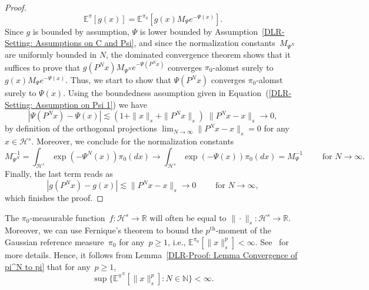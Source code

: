 \begin{proof}
\begin{equation*}
   \mathbb{E}^{\pi} [g(x)] = \mathbb{E}^{\pi_0} [g(x)M_{\Psi} e^{-\Psi(x)} ].
 \end{equation*}
 Since $g$ is bounded by assumption, $\Psi$ is lower bounded by Assumption~\ref{DLR-Setting: Assumptions on C and Psi}, and since the normalization constants~$M_{\Psi^N}$ are uniformly bounded in $N$, the dominated convergence theorem shows that it suffices to prove that $g(P^Nx) M_{\Psi^N} e^{-\Psi(P^Nx)}$ converges $\pi_0$-alomst surely to $g(x)M_{\Psi} e^{-\Psi(x)}$. Thus, we start to show that $\Psi(P^Nx)$ converges $\pi_0$-alomst surely to $\Psi(x)$. Using the boundedness assumption given in Equation~(\ref{DLR-Setting: Assumption on Psi 1}) we have
 \begin{equation*}
  | \Psi(P^Nx) - \Psi(x) | \lesssim  (1 + \|x\|_s + \|P^Nx\|_s) \; \|P^Nx-x\|_s \to 0,
 \end{equation*}
 by definition of the orthogonal projections $\lim_{N \to \infty}   \|P^Nx-x\|_s = 0$ for any $x \in \mathcal{H}^s$. Moreover, we conclude for the normalization constants
 \begin{equation*}
   M_{\Psi^N}^{-1}  = \int_{\mathcal{H}^s} \exp (-\Psi^N(x)) \pi_0(dx) \longrightarrow \int_{\mathcal{H}^s} \exp (-\Psi(x)) \pi_0(dx) = M_{\Psi}^{-1} \qquad \text{ for } N \to \infty.
 \end{equation*}
 Finally, the last term reads as
 \begin{equation*}
  |g(P^Nx) - g(x)| \lesssim \|P^Nx-x\|_s \longrightarrow 0 \qquad \text{ for } N \to \infty,
 \end{equation*}
 which finishes the proof.

\end{proof}

\begin{rem}
  \label{DLR: Remark Fernique's theorem}
  The $\pi_0$-measurable function~$f:\mathcal{H}^s \to \mathbb{R}$ will often be equal to $\| \cdot \|_s :\mathcal{H}^s \to \mathbb{R}$. Moreover, we can use Fernique's theorem to bound the $p^{\text{th}}$-moment of the Gaussian reference measure~$\pi_0$ for any~$p \geq 1$, i.e., $\mathbb{E}^{\pi_0}[\|x\|_s^p] < \infty$. See~\autocite[Theorem 3.11]{Hairer2009} for more details. Hence, it follows from Lemma~\ref{DLR-Proof: Lemma Convergence of pi^N to pi} that for any~$p \geq 1$, 
  \begin{equation*}
    \sup \{ \mathbb{E}^{\pi^N} [\|x\|_s^p] : N \in \mathbb{N}\} < \infty.
  \end{equation*}

\end{rem}


